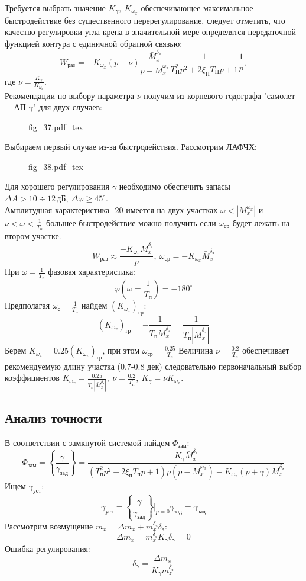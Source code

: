 \documentclass{article}
\begin{document}
Требуется выбрать значение $K_\gamma, \ K_{\omega_x}$ обеспечивающее
максимальное быстродействие без существенного перерегулирование, следует
отметить, что качество регулировки угла крена в значительной мере определятся
передаточной функцией контура с единичной обратной связью:
\[
	W_\text{раз} = -K_{\omega_x} (p + \nu)\frac{\bar{M}_x^{\delta_\text{э}}}{p
	-\bar{M}_x^{\omega_x}}\frac{1}{T_\text{П}^2 p^2 + 2 \xi_\text{П} T_\text{П}
		p + 1}\frac{1}{p},
\]
где $\nu = \frac{K_\gamma}{K_{\omega_x}}$.\\
Рекомендации по выбору параметра $\nu$ получим из корневого годографа "самолет
+ АП $\gamma$" для двух случаев:

\begin{figure}[H]
	\centering
	{fig_37.pdf_tex}
\end{figure}
Выбираем первый случае из-за быстродействия.
Рассмотрим ЛАФЧХ:
\begin{figure}[H]
	\centering
	{fig_38.pdf_tex}
\end{figure}

Для хорошего регулирования $\gamma$ необходимо обеспечить запасы $\Delta A > 10
	\div 12 \, \text{дБ},\ \Delta \varphi \geq 45^\circ$.\\
Амплитудная характеристика -20 имеется на двух участках $\omega <
	|M_x^{\omega_x}|$ и $\nu < \omega <\frac{1}{T_n}$ большее быстродействие можно
получить если $\omega_\text{ср}$ будет лежать на втором участке.
\[
	W_\text{раз} \approx \frac{-K_{\omega_x} \bar{M}_x^{\delta_\text{э}}}{p},\
	\omega_\text{ср} = -K_{\omega_x} \bar{M}_x^{\delta_\text{э}}
\]
При $\omega = \frac{1}{T_\text{п}}$ фазовая характеристика:
\[
	\varphi(\omega=\frac{1}{T_\text{п}}) = -180^\circ
\]
Предполагая $\omega_\text{с} = \frac{1}{T_\text{п}}$ найдем
$(K_{\omega_x})_\text{гр}$:
\[
	(K_{\omega_x})_\text{гр} = -\frac{1}{T_\text{п}
	\bar{M}_x^{\delta_\text{э}}} = \frac{1}{T_\text{п}
	|\bar{M}_x^{\delta_\text{э}}|}
\]
Берем $K_{\omega_x} = 0.25(K_{\omega_x})_\text{гр}$, при этом $\omega_\text{ср}
	= \frac{0.25}{T_\text{п}}$
Величина $\nu =\frac{0.2}{T_\text{п}}$ обеспечивает рекомендуемую длину участка
(0.7-0.8 дек) следовательно первоначальный выбор коэффициентов $K_{\omega_x}
	=\frac{0.25}{T_\text{п} |\bar{M}_x^{\delta_\text{э}}|}, \ \nu=
	\frac{0.2}{T_\text{п}},\ K_\gamma = \nu K_{\omega_x}$.

\subsection{Анализ точности}
В соответствии с замкнутой системой найдем $\Phi_\text{зам}$:
\[
	\Phi_\text{зам} =\left\{\frac{\gamma}{\gamma_\text{зад}}\right\} =
	\frac{K_\gamma \bar{M}_x^{\delta_\text{э}}}{(T_\text{п}^2 p^2 + 2
	\xi_\text{п} T_\text{п} p + 1)p(p - \bar{M}_x^{\omega_x}) - K_{\omega_x}(p
	+ \gamma)\bar{M}_x^{\delta_\text{э}}}
\]
Ищем $\gamma_\text{уст}$:
\[ \gamma_\text{уст} = \left\{\frac{\gamma}{\gamma_\text{зад}}\right\}\Big|_{p
	= 0} \gamma_\text{зад} = \gamma_\text{зад} \]
Рассмотрим возмущение $m_x = \Delta m_x + m_x^{\delta_\text{э}}
	\delta_\text{э}$:
\[
	\Delta m_x = m_x^{\delta_\text{э}} K_\gamma \delta_\gamma = 0
\]
Ошибка регулирования:
\[
	\delta_\gamma =\frac{\Delta m_x}{K_\gamma m_z^{\delta_\text{э}}}
\]
\end{document}
